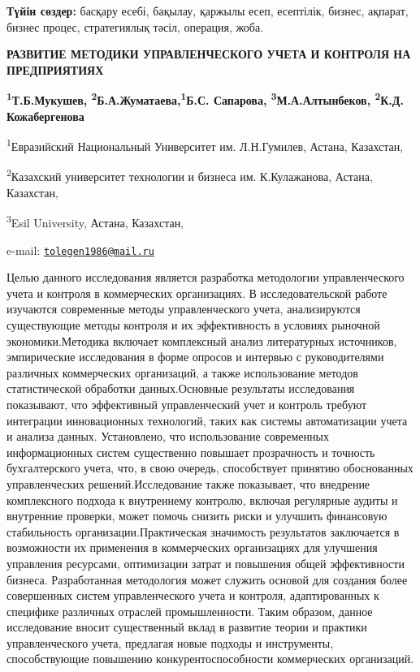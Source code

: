 {\bfseries Түйін сөздер:} басқару есебі, бақылау, қаржылы есеп, есептілік,
бизнес, ақпарат, бизнес процес, стратегиялық тәсіл, операция, жоба.
\begin{articleheader}

{\bfseries РАЗВИТИЕ МЕТОДИКИ УПРАВЛЕНЧЕСКОГО УЧЕТА И КОНТРОЛЯ НА
ПРЕДПРИЯТИЯХ}

{\bfseries \textsuperscript{1}Т.Б.Мукушев\textsuperscript{\envelope },
\textsuperscript{2}Б.А.Жуматаева,\textsuperscript{1}Б.С. Сапарова, 
\textsuperscript{3}М.А.Алтынбеков,
\textsuperscript{2}К.Д. Кожабергенова}
\end{articleheader}

\begin{affiliation}

\textsuperscript{1}Евразийский Национальный Университет им. Л.Н.Гумилев,
Астана, Казахстан,

\textsuperscript{2}Казахский университет технологии и бизнеса им.
К.Кулажанова, Астана, Казахстан, 

\textsuperscript{3}Esil University, Астана, Казахстан,

e-mail:
\href{mailto:tolegen1986@mail.ru}{\nolinkurl{tolegen1986@mail.ru}}
\end{affiliation}

Целью данного исследования является разработка методологии
управленческого учета и контроля в коммерческих организациях. В
исследовательской работе изучаются современные методы управленческого
учета, анализируются существующие методы контроля и их эффективность в
условиях рыночной экономики.Методика включает комплексный анализ
литературных источников, эмпирические исследования в форме опросов и
интервью с руководителями различных коммерческих организаций, а также
использование методов статистической обработки данных.Основные
результаты исследования показывают, что эффективный управленческий учет
и контроль требуют интеграции инновационных технологий, таких как
системы автоматизации учета и анализа данных. Установлено, что
использование современных информационных систем существенно повышает
прозрачность и точность бухгалтерского учета, что, в свою очередь,
способствует принятию обоснованных управленческих решений.Исследование
также показывает, что внедрение комплексного подхода к внутреннему
контролю, включая регулярные аудиты и внутренние проверки, может помочь
снизить риски и улучшить финансовую стабильность
организации.Практическая значимость результатов заключается в
возможности их применения в коммерческих организациях для улучшения
управления ресурсами, оптимизации затрат и повышения общей эффективности
бизнеса. Разработанная методология может служить основой для создания
более совершенных систем управленческого учета и контроля,
адаптированных к специфике различных отраслей промышленности. Таким
образом, данное исследование вносит существенный вклад в развитие теории
и практики управленческого учета, предлагая новые подходы и инструменты,
способствующие повышению конкурентоспособности коммерческих организаций.

